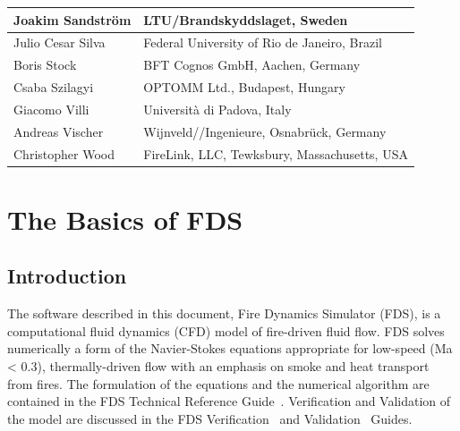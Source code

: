 \documentclass[11pt]{book}
\begin{document}
\begin{longtable}{|l|l|}
Joakim Sandstr\"{o}m                    & LTU/Brandskyddslaget, Sweden                                              \\ \hline
Julio Cesar Silva                       & Federal University of Rio de Janeiro, Brazil                              \\ \hline
Boris Stock                             & BFT Cognos GmbH, Aachen, Germany                                          \\ \hline
Csaba Szilagyi                          & OPTOMM Ltd., Budapest, Hungary                                            \\ \hline
Giacomo Villi                           & Universit\`{a} di Padova, Italy                                           \\ \hline
Andreas Vischer                         & Wijnveld//Ingenieure, Osnabr\"{u}ck, Germany                              \\ \hline
Christopher Wood                        & FireLink, LLC, Tewksbury, Massachusetts, USA                              \\ \hline
\end{longtable}

\cleardoublepage
{}
{}
\tableofcontents

\cleardoublepage
{}
{}
\listoffigures

\cleardoublepage
{}
{}
\listoftables


\mainmatter



\part{The Basics of FDS}


\chapter{Introduction}

The software described in this document, Fire Dynamics Simulator (FDS), is a computational
fluid dynamics (CFD) model of fire-driven fluid flow. FDS solves numerically a form of the
Navier-Stokes equations appropriate for low-speed (Ma < 0.3), thermally-driven flow
with an emphasis on smoke and heat transport from fires.
The formulation of the equations and the numerical algorithm are contained in the FDS Technical Reference Guide~\cite{FDS_Math_Guide}.
Verification and Validation of the model are discussed in the FDS Verification~\cite{FDS_Verification_Guide} and Validation~\cite{FDS_Validation_Guide} Guides.
\end{document}
